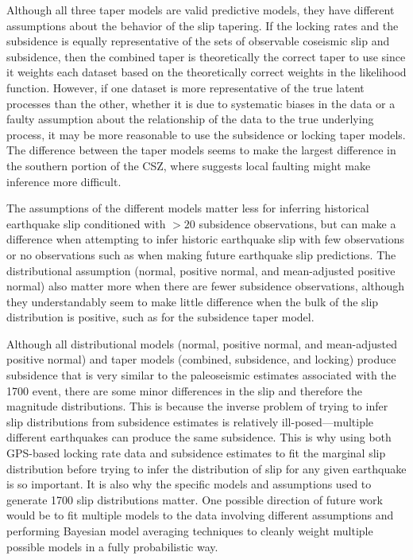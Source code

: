 {Although all three taper models are valid predictive models, they have different assumptions about the behavior of the slip tapering.  If the locking rates and the subsidence is equally representative of the sets of observable coseismic slip and subsidence, then the combined taper is theoretically the correct taper to use since it weights each dataset based on the theoretically correct weights in the likelihood function.  However, if one dataset is more representative of the true latent processes than the other, whether it is due to systematic biases in the data or a faulty assumption about the relationship of the data to the true underlying process, it may be more reasonable to use the subsidence or locking taper models.  The difference between the taper models seems to make the largest difference in the southern portion of the CSZ, where \citet{clarkeCarver1992} suggests local faulting might make inference more difficult.

The assumptions of the different models matter less for inferring historical earthquake slip conditioned with $>20$ subsidence observations, but can make a difference when attempting to infer historic earthquake slip with few observations or no observations such as when making future earthquake slip predictions.  The distributional assumption (normal, positive normal, and mean-adjusted positive normal) also matter more when there are fewer subsidence observations, although they understandably seem to make little difference when the bulk of the slip distribution is positive, such as for the subsidence taper model.

Although all distributional models (normal, positive normal, and mean-adjusted positive normal) and taper models (combined, subsidence, and locking) produce subsidence that is very similar to the paleoseismic estimates associated with the 1700 event, there are some minor differences in the slip and therefore the magnitude distributions.  This is because the inverse problem of trying to infer slip distributions from subsidence estimates is relatively ill-posed---multiple different earthquakes can produce the same subsidence.  This is why using both GPS-based locking rate data and subsidence estimates to fit the marginal slip distribution before trying to infer the distribution of slip for any given earthquake is so important.  It is also why the specific models and assumptions used to generate 1700 slip distributions matter.  One possible direction of future work would be to fit multiple models to the data involving different assumptions and performing Bayesian model averaging techniques to cleanly weight multiple possible models in a fully probabilistic way.

}
